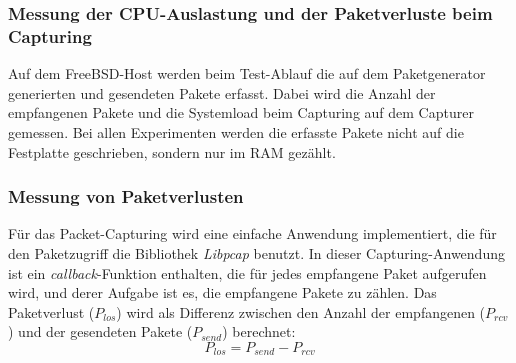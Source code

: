 \subsubsection{Messung der CPU-Auslastung und der Paketverluste beim Capturing}
Auf dem FreeBSD-Host werden beim Test-Ablauf die auf dem Paketgenerator
generierten und gesendeten Pakete erfasst. Dabei wird die Anzahl der
empfangenen Pakete und die Systemload beim Capturing auf dem Capturer gemessen.
Bei allen Experimenten werden die erfasste Pakete nicht auf die Festplatte 
geschrieben, sondern nur im RAM gezählt.
%
\subsubsection*{Messung von Paketverlusten}
Für das Packet-Capturing wird eine einfache Anwendung implementiert, die für den
Paketzugriff die Bibliothek \emph{Libpcap} benutzt. In dieser Capturing-Anwendung ist
ein \emph{callback}-Funktion enthalten, die für jedes empfangene Paket
aufgerufen wird, und derer Aufgabe ist es, die empfangene Pakete zu zählen.
Das Paketverlust (\begin{math}P_{los}\end{math}) wird als Differenz zwischen 
den Anzahl der empfangenen (\begin{math}P_{rcv}\end{math}) und
der gesendeten Pakete (\begin{math}P_{send}\end{math}) berechnet:
	\begin{equation}
		P_{los} = P_{send} - P_{rcv}
		\label{equ:pktloss}
	\end{equation}
%
